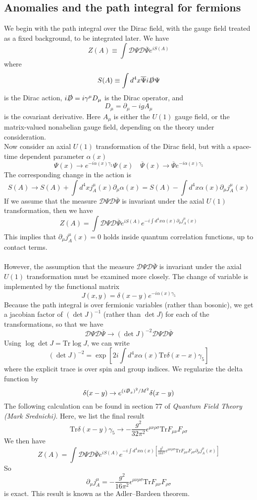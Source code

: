 \documentclass[cyan]{elegantnote}
\begin{document}
\subsection{Anomalies and the path integral for fermions}
We begin with the path integral over the Dirac field, with the gauge field treated as a fixed background, to be integrated later. We have
\[Z(A) \equiv \int \mathcal{D}\Psi \mathcal{D}\overline{\Psi} e^{iS(A)}\]
where
\[S(A) \equiv \int d^4x \overline{\Psi}i\slashed{D}\Psi \]
is the Dirac action, $i\slashed{D} = i\gamma^{\mu} D_{\mu}$
is the Dirac operator, and
\[D_{\mu} = \partial_{\mu} - igA_{\mu}\]
is the covariant derivative. Here $A_{\mu}$ is either the $U(1)$ gauge field, or the matrix-valued nonabelian gauge field, depending on the theory under consideration.
\\
Now consider an axial $U(1)$ transformation of the Dirac field, but with a space-time dependent parameter $\alpha(x)$
\[\Psi(x) \to e^{-i\alpha(x)\gamma_5}\Psi(x) \quad \overline{\Psi}(x) \to \overline{\Psi} e^{-i\alpha(x)\gamma_5}\]
The corresponding change in the action is
\[S(A) \to S(A) + \int d^4x j^{\mu}_A(x) \partial_{\mu}\alpha(x) = S(A) - \int d^4x \alpha(x) \partial_{\mu}j^{\mu}_A(x) \]
If we assume that the measure $\mathcal{D}\Psi \mathcal{D}\overline{\Psi}$ is invariant under the axial $U(1)$ transformation, then we have
\[Z(A) = \int \mathcal{D}\Psi \mathcal{D}\overline{\Psi} e^{iS(A)} e^{-i \int d^4x \alpha(x)\partial_{\mu}j^{\mu}_A(x) }\]
This implies that $\partial_{\mu}j^{\mu}_A(x) = 0$ holds inside quantum correlation functions, up to contact terms.
\\ \\
However, the assumption that the measure $\mathcal{D}\Psi \mathcal{D}\overline{\Psi}$ is invariant under the axial $U(1)$ transformation must be examined more closely. The change of variable is implemented by the functional matrix
\[J(x,y) = \delta(x-y)e^{-i\alpha(x)\gamma_5} \]
Because the path integral is over fermionic variables (rather than bosonic), we get a jacobian factor of $(\det J)^{-1}$ (rather than $\det J$) for each of the transformations, so that we have
\[\mathcal{D}\Psi \mathcal{D}\overline{\Psi} \to (\det J)^{-2}\mathcal{D}\Psi \mathcal{D}\overline{\Psi}\]
Using $\log \det J = \mathrm{Tr} \log J$, we can write
\[(\det J)^{-2} = \exp \left[2i \int d^4x \alpha(x) \mathrm{Tr}\delta(x-x)\gamma_5 \right]\]
where the explicit trace is over spin and group indices. We regularize the delta function by
\[\delta(x-y) \to e^{(i\slashed{D}_x)^2/M^2} \delta(x-y)\]
The following calculation can be found in section 77 of \emph{Quantum Field Theory (Mark Srednichi)}. Here, we list the final result
\[\mathrm{Tr} \delta(x-y)\gamma_5 \to - \frac{g^2}{32\pi^2} \epsilon^{\mu\nu\rho\sigma} \mathrm{Tr} F_{\mu\nu}F_{\rho\sigma}\]
We then have
\[Z(A) = \int \mathcal{D}\Psi \mathcal{D}\overline{\Psi} e^{iS(A)} e^{-i \int d^4x \alpha(x)[ \frac{g^2}{16\pi^2} \epsilon^{\mu\nu\rho\sigma} \mathrm{Tr} F_{\mu\nu}F_{\rho\sigma} \partial_{\mu}j^{\mu}_A(x)] }\]
So
\[\partial_{\mu} j^{\mu}_A = -\frac{g^2}{16\pi^2} \epsilon^{\mu\nu\rho\sigma} \mathrm{Tr} F_{\mu\nu}F_{\rho\sigma}\]
is exact. This result is known as the Adler–Bardeen theorem.
\end{document}

